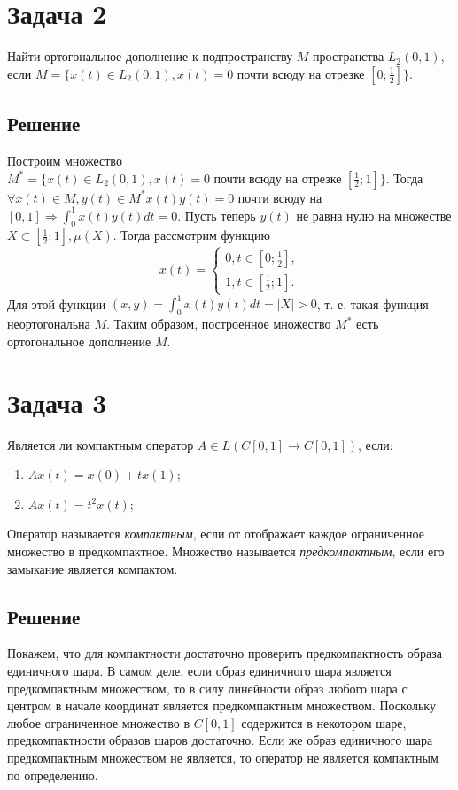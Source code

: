 \documentclass[11pt]{article}
\begin{document}
\section{Задача 2}
\label{sec:orgfc008f0}
Найти ортогональное дополнение к подпространству \(M\) пространства \(L_2(0, 1)\), если \(M = \{x(t) \in L_2(0, 1), x(t) = 0 \text{ почти всюду на отрезке }[0; \frac12]\}\).
\subsection{Решение}
\label{sec:org5717f02}
Построим множество \(M^* = \{x(t) \in L_2(0, 1), x(t) = 0 \text{ почти всюду на отрезке } [\frac12; 1]\}\). Тогда \(\forall x(t) \in M, y(t) \in M^* x(t)y(t) = 0\) почти всюду на \([0, 1] \Rightarrow \int_0^1x(t)y(t)dt = 0\). Пусть теперь \(y(t)\) не равна нулю на множестве \(X \subset [\frac12; 1], \mu(X)\). Тогда рассмотрим функцию
\begin{equation}
x(t) = \begin{cases}
0, t \in [0; \frac12], \\
1, t \in [\frac12; 1].
\end{cases}
\end{equation}
Для этой функции \((x, y) = \int_0^1x(t)y(t)dt = |X| > 0\), т. е. такая функция неортогональна \(M\). Таким образом, построенное множество \(M^*\) есть ортогональное дополнение \(M\).
\section{Задача 3}
\label{sec:org35cab7f}
Является ли компактным оператор \(A \in L(C[0, 1] \rightarrow C[0, 1])\), если:
\begin{enumerate}
\item \(Ax(t) = x(0) + tx(1)\);
\item \(Ax(t) = t^2x(t)\);
\end{enumerate}
Оператор называется \emph{компактным}, если от отображает каждое ограниченное множество в предкомпактное. Множество называется \emph{предкомпактным}, если его замыкание является компактом.
\subsection{Решение}
\label{sec:orga185839}
Покажем, что для компактности достаточно проверить предкомпактность образа единичного шара. В самом деле, если образ единичного шара является предкомпактным множеством, то в силу линейности образ любого шара с центром в начале координат является предкомпактным множеством. Поскольку любое ограниченное множество в \(C[0, 1]\) содержится в некотором шаре, предкомпактности образов шаров достаточно. Если же образ единичного шара предкомпактным множеством не является, то оператор не является компактным по определению.
\end{document}
